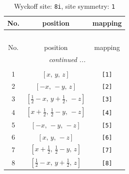 \documentclass[fleqn,8pt]{jsarticle}
\begin{document}
\renewcommand{\arraystretch}{1.2}
\begin{longtable}{ccc}
\caption{Wyckoff site: {\tt 8i}, site symmetry: {\tt 1}}
 \\
 \hline \hline
No. & position & mapping \\ \hline \endfirsthead

\multicolumn{2}{l}{\tablename\ \thetable{}} \\
 \hline \hline
No. & position & mapping \\ \hline \endhead

 \hline \hline
\multicolumn{2}{r}{\footnotesize\it continued ...} \\ \endfoot

 \hline \hline
\multicolumn{2}{r}{} \\ \endlastfoot

1 & $\left[ x,\, y,\, z \right]$ & {\tt [1]} \\ \hline
2 & $\left[ - x,\, - y,\, z \right]$ & {\tt [2]} \\ \hline
3 & $\left[ \frac{1}{2} - x,\, y + \frac{1}{2},\, - z \right]$ & {\tt [3]} \\ \hline
4 & $\left[ x + \frac{1}{2},\, \frac{1}{2} - y,\, - z \right]$ & {\tt [4]} \\ \hline
5 & $\left[ - x,\, - y,\, - z \right]$ & {\tt [5]} \\ \hline
6 & $\left[ x,\, y,\, - z \right]$ & {\tt [6]} \\ \hline
7 & $\left[ x + \frac{1}{2},\, \frac{1}{2} - y,\, z \right]$ & {\tt [7]} \\ \hline
8 & $\left[ \frac{1}{2} - x,\, y + \frac{1}{2},\, z \right]$ & {\tt [8]} \\
\end{longtable}
\end{document}
